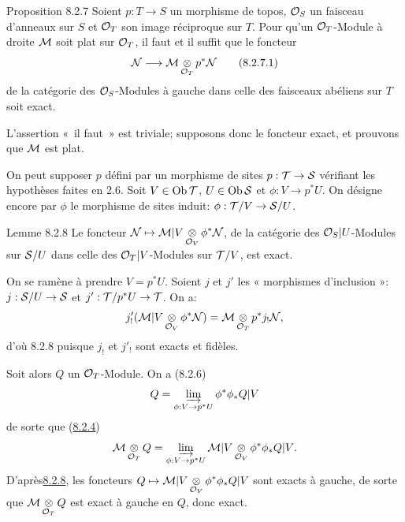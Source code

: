 \documentclass[10pt]{../fichiers-configuration-latex/smfart}
\begin{document}
\begin{enonce*}{Proposition 8.2.7}
Soient $p : T \to S$ un morphisme de topos, ${\mathcal O}_S$ un
faisceau d'anneaux sur $S$ et ${\mathcal O}_T$ son image réciproque sur
$T$. Pour qu'un ${\mathcal O}_T$-Module à droite ${\mathcal M}$ soit
plat sur ${\mathcal O}_T$, il faut et il suffit que le foncteur
\begin{equation*}
\Nn \to \Mm \mathop{\otimes}_{\Oo_{T}} p^{\ast} \Nn\tag{8.2.7.1}
\end{equation*}
de la catégorie des ${\mathcal O}_S$-Modules à gauche dans celle des
faisceaux abéliens sur $T$ soit exact.
\end{enonce*}

L'assertion « il faut » est triviale; supposons donc le foncteur
 exact, et prouvons que ${\mathcal M}$ est plat.

On peut supposer $p$ défini par un morphisme de sites $p :
\Tt \to \Ss$ vérifiant les hypothèses faites en 2.6. Soit $V
\in \operatorname{Ob} {\mathcal T}$, $U \in \operatorname{Ob} {\mathcal S}$ et $\phi : V \to p^{\ast} U$. On désigne
encore par $\phi$ le morphisme de sites induit: $\phi :
\Tt/V \to \Ss/U$.

\begin{enonce*}{Lemme 8.2.8}
Le foncteur ${\mathcal N} \mapsto {\mathcal M} | V
\displaystyle\mathop{\otimes}_{{\mathcal O}_{V}} \phi^{\ast} {\mathcal N}$,
de la catégorie des ${\mathcal O}_S | U$-Modules sur ${\mathcal S}/U$ dans celle
des ${\mathcal O}_T | V$-Modules sur ${\mathcal T}/V$, est exact.
\end{enonce*}

On se ramène à prendre $V = p^{\ast} U$. Soient $j$ et $j'$ les «
morphismes d'inclusion »: $j : \Ss / U \to \Ss$ et $j': \Tt /p^{\ast}
U \to \Tt$. On a:
$$
j'_{!} ({\mathcal M} | V \mathop{\otimes}_{{\mathcal O}_{V}} \phi^{\ast}
{\mathcal N}) = {\mathcal M} \mathop{\otimes}_{{\mathcal O}_T} p^{\ast} j_{!} {\mathcal N}{},
$$
d'où 8.2.8 puisque $j_{!}$ et $j'_{!}$ sont exacts et fidèles.

Soit alors $Q$ un ${\mathcal O}_T$-Module. On a (8.2.6)
$$
Q = \varinjlim_{\phi : V \to p^{\ast} U} \phi^{\ast} \phi_{\ast} Q | V
$$
de sorte que (\hyperref[V.prop8.2.4]{8.2.4})
$$
\Mm \mathop{\otimes}_{\Oo_{T}} Q = \varinjlim_{\phi
  : V \to p^{\ast} U} \Mm | V
\mathop{\otimes}_{\Oo_{V}} \phi^{\ast} \phi_{\ast} Q | V {\quoi}.
$$
D'après\pageoriginale \hyperref[V.lem8.2.8]{8.2.8}, les foncteurs $Q \mapsto {\mathcal M} | V
\displaystyle\mathop{\otimes}_{{\mathcal O}_{V}} \phi^{\ast}
\phi_{\ast} Q | V$ sont exacts à gauche, de sorte
que ${\mathcal M} \displaystyle\mathop{\otimes}_{{\mathcal O}_T} Q$ est exact à
gauche en $Q$, donc exact.
\end{document}
